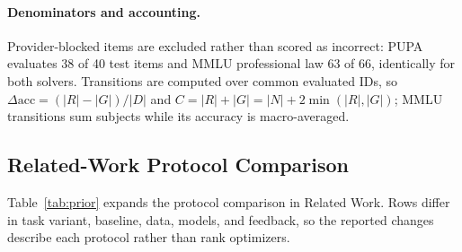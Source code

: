 \documentclass[11pt]{article}
\begin{document}
\paragraph{Denominators and accounting.}
Provider-blocked items are excluded rather than scored as incorrect: PUPA evaluates 38 of 40 test items and MMLU
professional law 63 of 66, identically for both solvers. Transitions are computed over common evaluated IDs, so
$\Delta\mathrm{acc}=(|R|-|G|)/|D|$ and $C=|R|+|G|=|N|+2\min(|R|,|G|)$; MMLU transitions sum subjects while its
accuracy is macro-averaged.

\subsection{Related-Work Protocol Comparison}
\label{app:prior}
Table~\ref{tab:prior} expands the protocol comparison in Related Work. Rows differ in task variant, baseline, data,
models, and feedback, so the reported changes describe each protocol rather than rank optimizers.
\end{document}

